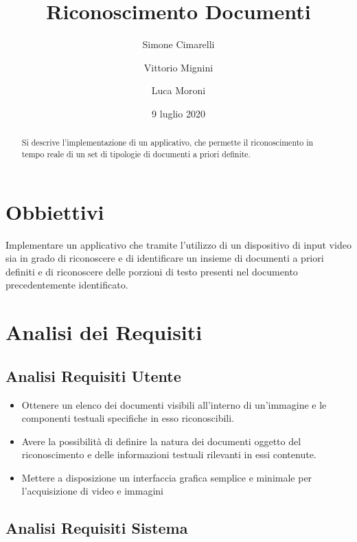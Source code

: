 \documentclass[12pt,a4paper]{article}
\begin{document}
\title{Riconoscimento Documenti}
\author{Simone Cimarelli \and Vittorio Mignini \and Luca Moroni}
\date{9 luglio 2020}

\maketitle

\begin{abstract}
    Si descrive l'implementazione di un applicativo, che permette il
    riconoscimento in tempo reale di un set di tipologie di documenti a
    priori definite.
\end{abstract}

\section{Obbiettivi}

Implementare un applicativo che tramite l'utilizzo di un dispositivo di
input video sia in grado di riconoscere e di identificare un insieme di
documenti a priori definiti e di riconoscere delle porzioni di testo
presenti nel documento precedentemente identificato.

\section{Analisi dei Requisiti}
\subsection{Analisi Requisiti Utente}

\begin{itemize}
    \item Ottenere un elenco dei documenti visibili all'interno di
        un'immagine e le componenti testuali specifiche in esso
        riconoscibili.
    \item Avere la possibilità di definire la natura dei documenti
        oggetto del riconoscimento e delle informazioni testuali
        rilevanti in essi contenute.
    \item Mettere a disposizione un interfaccia grafica semplice e
        minimale per l'acquisizione di video e immagini
\end{itemize}

\subsection{Analisi Requisiti Sistema}
\end{document}
